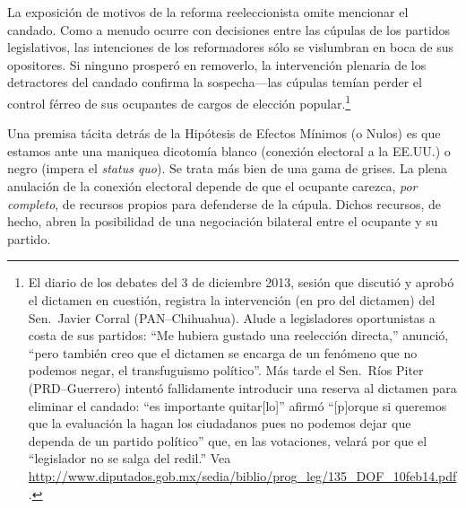 \documentclass[letter,12pt]{article}
\begin{document}
La exposición de motivos de la reforma reeleccionista omite mencionar el candado. Como a menudo ocurre con decisiones entre las cúpulas de los partidos legislativos, las intenciones de los reformadores sólo se vislumbran en boca de sus opositores. Si ninguno prosperó en removerlo, la intervención plenaria de los detractores del candado confirma la sospecha---las cúpulas temían perder el control férreo de sus ocupantes de cargos de elección popular.\footnote{El diario de los debates del 3 de diciembre 2013, sesión que discutió y aprobó el dictamen en cuestión, registra la intervención (en pro del dictamen) del Sen.\ Javier Corral (PAN--Chihuahua). Alude a legisladores oportunistas a costa de sus partidos: ``Me hubiera gustado una reelección directa,'' anunció, ``pero también creo que el dictamen se encarga de un fenómeno que no podemos negar, el transfuguismo político''. Más tarde el Sen.\ Ríos Piter (PRD--Guerrero) intentó fallidamente introducir una reserva al dictamen para eliminar el candado: ``es importante quitar[lo]'' afirmó ``[p]orque si queremos que la evaluación la hagan los ciudadanos pues no podemos dejar que dependa de un partido político'' que, en las votaciones, velará por que el ``legislador no se salga del redil.'' Vea \url{http://www.diputados.gob.mx/sedia/biblio/prog_leg/135_DOF_10feb14.pdf}.}



Una premisa tácita detrás de la Hipótesis de Efectos Mínimos (o Nulos) es que estamos ante una maniquea dicotomía blanco (conexión electoral a la EE.UU.) o negro (impera el \emph{status quo}). Se trata más bien de una gama de grises. La plena anulación de la conexión electoral depende de que el ocupante carezca, \emph{por completo}, de recursos propios para defenderse de la cúpula. Dichos recursos, de hecho, abren la posibilidad de una negociación bilateral entre el ocupante y su partido. 
\end{document}
